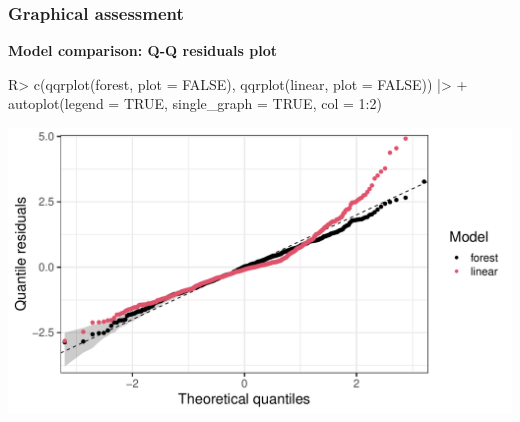 \documentclass[11pt,t,usepdftitle=false,aspectratio=169]{beamer}
\begin{document}
\begin{frame}[fragile]
\addtocounter{framenumber}{-1}
\frametitle{Graphical assessment}

\vspace{-0.75em}

\textbf{Model comparison: Q-Q residuals plot}

\vspace{0.5em}

\begin{Schunk}
\begin{Sinput}
R> c(qqrplot(forest, plot = FALSE), qqrplot(linear, plot = FALSE)) |>
+    autoplot(legend = TRUE, single_graph = TRUE, col = 1:2)
\end{Sinput}
\end{Schunk}

\begin{center}
\includegraphics{slides-rain_topmodels_lm_qqrplot2}
\end{center}

\end{frame}
\end{document}
